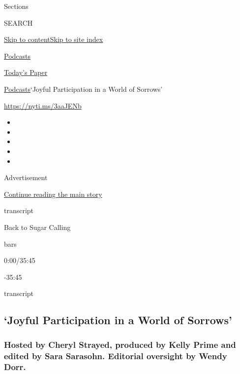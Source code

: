 Sections

SEARCH

\protect\hyperlink{site-content}{Skip to
content}\protect\hyperlink{site-index}{Skip to site index}

\href{https://www.nytimes3xbfgragh.onion/spotlight/podcasts}{Podcasts}

\href{https://myaccount.nytimes3xbfgragh.onion/auth/login?response_type=cookie\&client_id=vi}{}

\href{https://www.nytimes3xbfgragh.onion/section/todayspaper}{Today's
Paper}

\href{/spotlight/podcasts}{Podcasts}\textbar{}`Joyful Participation in a
World of Sorrows'

\url{https://nyti.ms/3aaJENb}

\begin{itemize}
\item
\item
\item
\item
\item
\end{itemize}

Advertisement

\protect\hyperlink{after-top}{Continue reading the main story}

transcript

Back to Sugar Calling

bars

0:00/35:45

-35:45

transcript

\hypertarget{joyful-participation-in-a-world-of-sorrows}{%
\subsection{`Joyful Participation in a World of
Sorrows'}\label{joyful-participation-in-a-world-of-sorrows}}

\hypertarget{hosted-by-cheryl-strayed-produced-by-kelly-prime-and-edited-by-sara-sarasohn-editorial-oversight-by-wendy-dorr}{%
\subsubsection{Hosted by Cheryl Strayed, produced by Kelly Prime and
edited by Sara Sarasohn. Editorial oversight by Wendy
Dorr.}\label{hosted-by-cheryl-strayed-produced-by-kelly-prime-and-edited-by-sara-sarasohn-editorial-oversight-by-wendy-dorr}}

